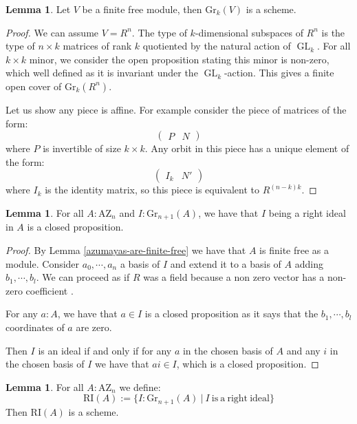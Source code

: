 \documentclass[10pt,a4paper]{article}
\theoremstyle{definition}
\newtheorem{lemma}[theorem]{Lemma}
\newcommand{\Gr}{\mathrm{Gr}}
\DeclareMathOperator{\GL}{GL}
\newcommand{\RI}{\mathrm{RI}}
\newcommand{\AZ}{\mathrm{AZ}}
\begin{document}
\begin{lemma}\label{grassmanians-are-schemes}
Let $V$ be a finite free module, then $\Gr_k(V)$ is a scheme.
\end{lemma}

\begin{proof}
We can assume $V=R^n$. The type of $k$-dimensional subspaces of $R^n$ is the type of $n\times k$ matrices of rank $k$ quotiented by the natural action of $\GL_k$. For all $k\times k$ minor, we consider the open proposition stating this minor is non-zero, which well defined as it is invariant under the $\GL_k$-action. This gives a finite open cover of $\Gr_k(R^n)$.

Let us show any piece is affine. For example consider the piece of matrices of the form:
\[\begin{pmatrix}
P & N
\end{pmatrix}\]
where $P$ is invertible of size $k\times k$. Any orbit in this piece has a unique element of the form:
\[\begin{pmatrix}
I_k & N'
\end{pmatrix}\]
where $I_k$ is the identity matrix, so this piece is equivalent to $R^{(n-k)k}$.
\end{proof}

\begin{lemma}\label{being-ideal-in-azumaya-closed}
For all $A:\AZ_n$ and $I:\Gr_{n+1}(A)$, we have that $I$ being a right ideal in $A$ is a closed proposition.
\end{lemma}

\begin{proof}
By Lemma \ref{azumayas-are-finite-free} we have that $A$ is finite free as a module. Consider $a_0,\cdots,a_n$ a basis of $I$ and extend it to a basis of $A$ adding $b_1,\cdots,b_l$. We can proceed as if $R$ was a field because a non zero vector has a non-zero coefficient \cite{draft}.

For any $a:A$, we have that $a\in I$ is a closed proposition as it says that the $b_1,\cdots,b_l$ coordinates of $a$ are zero. 

Then $I$ is an ideal if and only if for any $a$ in the chosen basis of $A$ and any $i$ in the chosen basis of $I$ we have that $ai\in I$, which is a closed proposition.
\end{proof}

\begin{lemma}\label{severi-brauer-are-schemes}
For all $A:\AZ_n$ we define:
\[\RI(A) := \{I:\Gr_{n+1}(A)\ |\ I\ \mathrm{is\ a\ right\ ideal}\}\]
Then $\RI(A)$ is a scheme.
\end{lemma}
\end{document}
